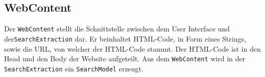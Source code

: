 
\subsection{WebContent}
Der \lstinline|WebContent| stellt die Schnittstelle zwischen dem User Interface und der\linebreak \lstinline|SearchExtraction| dar. Er beinhaltet HTML-Code, in Form eines Strings, sowie die URL, von welcher der HTML-Code stammt. Der HTML-Code ist in den Head und den Body der Website aufgeteilt. Aus dem \lstinline|WebContent| wird in der \lstinline|SearchExtraction| ein \lstinline|SearchModel| erzeugt.